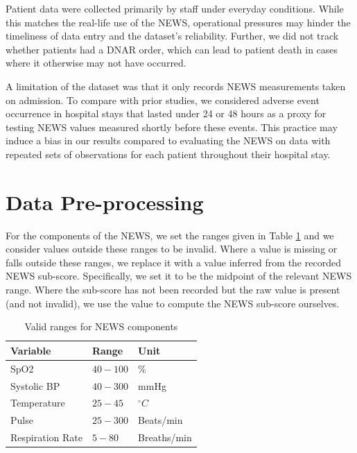 \documentclass[10pt,journal, compsoc]{IEEEtran}
\begin{document}
Patient data were collected primarily by staff under everyday conditions. While this matches the real-life use of the NEWS, operational pressures may hinder the timeliness of data entry and the dataset's reliability. Further, we did not track whether patients had a DNAR order, which can lead to patient death in cases where it otherwise may not have occurred.

A limitation of the dataset was that it only records NEWS measurements taken on admission. To compare with prior studies, we considered adverse event occurrence in hospital stays that lasted under 24 or 48 hours as a proxy for testing NEWS values measured shortly before these events. This practice may induce a bias in our results compared to evaluating the NEWS on data with repeated sets of observations for each patient throughout their hospital stay.


\printbibliography


\onecolumn
\appendices
\setlength{\parskip}{\baselineskip}%
\setlength{\parindent}{0pt}%
\section{Data Pre-processing}
\label{appendix:preprocessing}
For the components of the NEWS, we set the ranges given in Table \ref{tab:news_valid_ranges} and we consider values outside these ranges to be invalid.
Where a value is missing or falls outside these ranges, we replace it with a value inferred from the recorded NEWS sub-score. Specifically, we set it to be the midpoint of the relevant NEWS range. Where the sub-score has not been recorded but the raw value is present (and not invalid), we use the value to compute the NEWS sub-score ourselves.

\begin{table}[h]
    \renewcommand{\arraystretch}{1.3}
    \centering
    \caption{Valid ranges for NEWS components}
    \label{tab:news_valid_ranges}
    \begin{tabular}{lll}
        \toprule
        Variable         & Range    & Unit        \\
        \midrule
        SpO2             & $40-100$ & $\%$        \\
        Systolic BP      & $40-300$ & mmHg        \\
        Temperature      & $25-45$  & $^{\circ}C$ \\
        Pulse            & $25-300$ & Beats/min   \\
        Respiration Rate & $5-80$   & Breaths/min \\
        \bottomrule
    \end{tabular}
\end{table}
\end{document}
